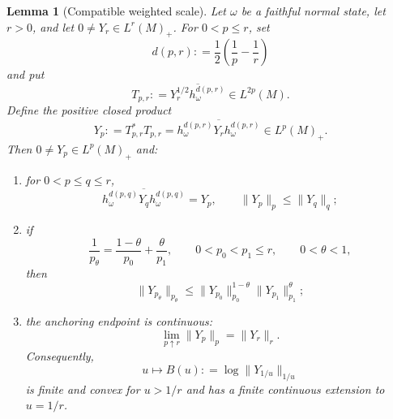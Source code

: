 \documentclass[12pt]{article}
\numberwithin{equation}{section}
\newtheorem{lemma}[theorem]{Lemma}
\theoremstyle{definition}
\theoremstyle{remark}
\newcommand{\?}{\overset{?}{=}}
\newcommand{\defeq}{\mathrel{\mathop:}=}
\begin{document}
\begin{lemma}[Compatible weighted scale]
\label{lem:compatible-weighted-scale}
Let $\omega$ be a faithful normal state, let $r>0$, and let
$0\ne Y_r\in L^r(M)_+$.  For $0<p\leq r$, set
\begin{equation}
  d(p,r)\defeq \frac12\left(\frac1p-\frac1r\right)
  \label{eq:weighted-exponent}
\end{equation}
and put
\[
  T_{p,r}\defeq
  \overline{Y_r^{1/2}h_\omega^{d(p,r)}}\in L^{2p}(M).
\]
Define
the positive closed product
\begin{equation}
  Y_p
  \defeq T_{p,r}^*T_{p,r}
  =\overline{h_\omega^{d(p,r)}Y_rh_\omega^{d(p,r)}}
  \in L^p(M)_+.
  \label{eq:weighted-path}
\end{equation}
Then $0\ne Y_p\in L^p(M)_+$ and:
\begin{enumerate}[label=\textup{(\roman*)}]
\item for $0<p\leq q\leq r$,
\begin{equation}
  \overline{h_\omega^{d(p,q)}Y_qh_\omega^{d(p,q)}}=Y_p,
  \qquad
  \|Y_p\|_p\leq\|Y_q\|_q;
  \label{eq:weighted-compatibility}
\end{equation}
\item if
\begin{equation*}
  \frac1{p_\theta}
  =\frac{1-\theta}{p_0}+\frac{\theta}{p_1},
  \qquad 0<p_0<p_1\leq r,\qquad 0<\theta<1,
\end{equation*}
then
\begin{equation}
  \|Y_{p_\theta}\|_{p_\theta}
  \leq\|Y_{p_0}\|_{p_0}^{1-\theta}
       \|Y_{p_1}\|_{p_1}^{\theta};
  \label{eq:weighted-log-convexity}
\end{equation}
\item the anchoring endpoint is continuous:
\begin{equation}
  \lim_{p\uparrow r}\|Y_p\|_p=\|Y_r\|_r.
  \label{eq:weighted-endpoint-continuity}
\end{equation}
Consequently,
\begin{equation}
  u\longmapsto B(u)\defeq \log\|Y_{1/u}\|_{1/u}
  \label{eq:weighted-convex-B}
\end{equation}
is finite and convex for $u>1/r$ and has a finite continuous extension to
$u=1/r$.
\end{enumerate}
\end{lemma}
\end{document}
